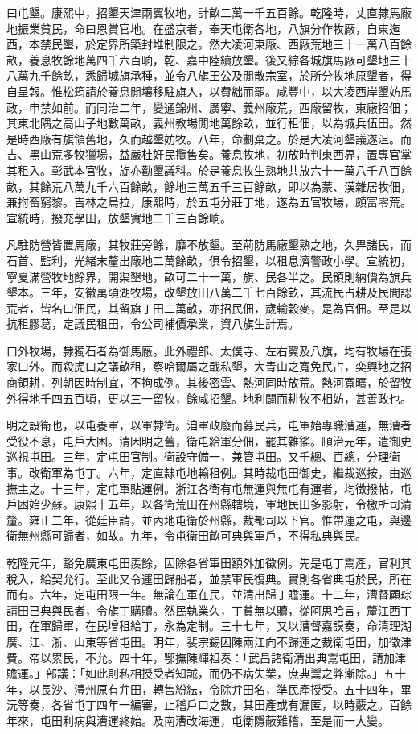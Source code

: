 \begin{pinyinscope}
曰屯墾。康熙中，招墾天津兩翼牧地，計畝二萬一千五百餘。乾隆時，丈直隸馬廠地振業貧民，命曰恩賞官地。在盛京者，奉天屯衛各地，八旗分作牧廠，自東迤西，本禁民墾，於定界所築封堆制限之。然大凌河東廠、西廠荒地三十一萬八百餘畝，養息牧餘地萬四千六百晌，乾、嘉中陸續放墾。後又綜各城旗馬廠可墾地三十八萬九千餘畝，悉歸城旗承種，並令八旗王公及閒散宗室，於所分牧地原墾者，得自呈報。惟松筠請於養息閒壤移駐旗人，以費絀而罷。咸豐中，以大凌西岸墾妨馬政，申禁如前。而同治二年，變通錦州、廣寧、義州廠荒，西廠留牧，東廠招佃；其東北隅之高山子地數萬畝，義州教場閒地萬餘畝，並行租佃，以為城兵伍田。然是時西廠有旗領舊地，久而越墾妨牧。八年，命劃棄之。於是大凌河墾議遂沮。而吉、黑山荒多牧獵場，益嚴杜奸民攬售矣。養息牧地，初放時判東西界，置專官掌其租入。彰武本官牧，旋亦勸墾議科。於是養息牧生熟地共放六十一萬八千八百餘畝，其餘荒八萬九千六百餘畝，餘地三萬五千三百餘畝，即以為蒙、漢雜居牧佃，兼拊畜窮黎。吉林之烏拉，康熙時，於五屯分莊丁地，遂為五官牧場，頗富零荒。宣統時，撥充學田，放墾實地二千三百餘晌。

凡駐防營皆置馬廠，其牧莊旁餘，靡不放墾。至荊防馬廠墾熟之地，久畀諸民，而石首、監利，光緒末釐出廠地二萬餘畝，俱令招墾，以租息濟警政小學。宣統初，寧夏滿營牧地餘界，開渠墾地，畝可二十一萬，旗、民各半之。民領則納價為旗兵墾本。三年，安徽萬頃湖牧場，改墾放田八萬二千七百餘畝，其流民占耕及民間認荒者，皆名曰佃民，其留旗丁田二萬畝，亦招民佃，歲輸穀麥，是為官佃。至是以抗租膠葛，定議民租田，令公司補價承業，資八旗生計焉。

口外牧場，隸獨石者為御馬廠。此外禮部、太僕寺、左右翼及八旗，均有牧場在張家口外。而殺虎口之議畝租，察哈爾屬之戢私墾，大青山之寬免民占，奕興地之招商領耕，列朝因時制宜，不拘成例。其後密雲、熱河同時放荒。熱河寬曠，於留牧外得地千四五百頃，更以三一留牧，餘咸招墾。地利闢而耕牧不相妨，甚善政也。

明之設衛也，以屯養軍，以軍隸衛。洎軍政廢而募民兵，屯軍始專職漕運，無漕者受役不息，屯戶大困。清因明之舊，衛屯給軍分佃，罷其雜徭。順治元年，遣御史巡視屯田。三年，定屯田官制。衛設守備一，兼管屯田。又千總、百總，分理衛事。改衛軍為屯丁。六年，定直隸屯地輸租例。其時裁屯田御史，繼裁巡按，由巡撫主之。十三年，定屯軍貼運例。浙江各衛有屯無運與無屯有運者，均徵撥帖，屯戶困始少蘇。康熙十五年，以各衛荒田在州縣轄境，軍地民田多影射，令檄所司清釐。雍正二年，從廷臣請，並內地屯衛於州縣，裁都司以下官。惟帶運之屯，與邊衛無州縣可歸者，如故。九年，令屯衛田畝可典與軍戶，不得私典與民。

乾隆元年，豁免廣東屯田羨餘，因除各省軍田額外加徵例。先是屯丁鬻產，官利其稅入，給契允行。至此又令運田歸船者，並禁軍民復典。實則各省典屯於民，所在而有。六年，定屯田限一年。無論在軍在民，並清出歸丁贍運。十二年，漕督顧琮請田已典與民者，令旗丁購贖。然民執業久，丁貧無以贖，從阿思哈言，釐江西丁田，在軍歸軍，在民增租給丁，永為定制。三十七年，又以漕督嘉謨奏，命清理湖廣、江、浙、山東等省屯田。明年，裴宗錫因陳兩江向不歸運之裁衛屯田，加徵津費。帝以累民，不允。四十年，鄂撫陳輝祖奏：「武昌諸衛清出典鬻屯田，請加津贍運。」部議：「如此則私相授受者知誡，而仍不病失業，庶典鬻之弊漸除。」五十年，以長沙、澧州原有弁田，轉售紛紜，令除弁田名，準民產授受。五十四年，畢沅等奏，各省屯丁四年一編審，止稽戶口之數，其田產或有漏匿，以時覈之。百餘年來，屯田利病與漕運終始。及南漕改海運，屯衛隱蔽難稽，至是而一大變。


\end{pinyinscope}
